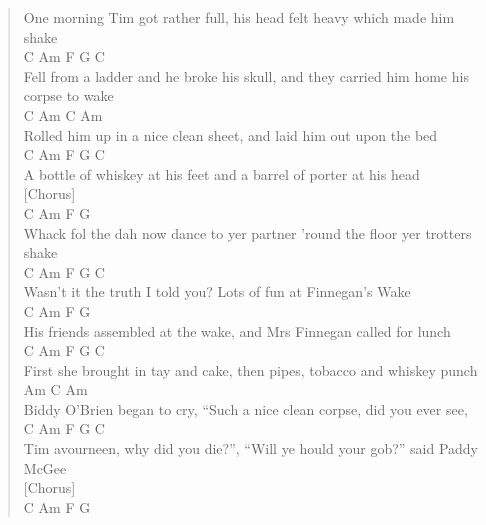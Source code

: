 \documentclass[11pt]{article}
\begin{document}
\begin{verse}
One morning Tim got rather full, his head felt heavy which made him shake\\
C                         Am                        F                    G         C\\
Fell from a ladder and he broke his skull, and they carried him home his corpse to wake\\
C                  Am                    C             Am\\
Rolled him up in a nice clean sheet, and laid him out upon the bed\\
\hspace*{2em}C                 Am                F                G      C\\
A bottle of whiskey at his feet and a barrel of porter at his head\\
\vspace*{1em}
[Chorus]\\
C                     Am                    F                   G\\
Whack fol the dah now dance to yer partner 'round the floor yer trotters shake\\
C             Am                F              G          C\\
Wasn't it the truth I told you? Lots of fun at Finnegan's Wake\\
\vspace*{1em}
\hspace*{5em}C                Am               F            G\\
His friends assembled at the wake, and Mrs Finnegan called for lunch\\
C                    Am                 F                  G       C\\
First she brought in tay and cake, then pipes, tobacco and whiskey punch\\
\hspace*{16em}Am                  C                          Am\\
Biddy O'Brien began to cry, ``Such a nice clean corpse, did you ever see,\\
C                  Am                      F                     G       C\\
Tim avourneen, why did you die?'', ``Will ye hould your gob?'' said Paddy McGee\\
\vspace*{1em}
[Chorus]\\
C                     Am                    F                   G\\

\end{verse}
\end{document}
